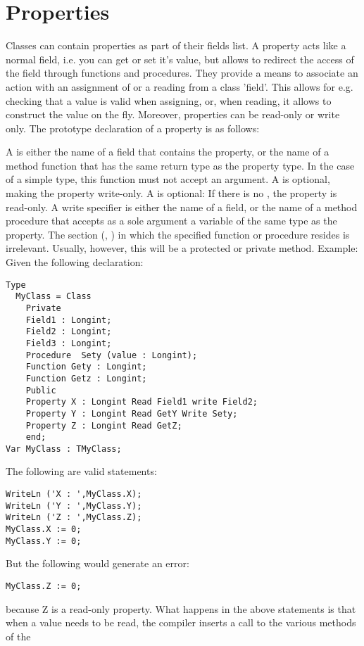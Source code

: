 \documentclass{report}
\begin{document}
\section{Properties}
Classes can contain properties as part of their fields list. A property
acts like a normal field, i.e. you can get or set it's value, but
allows to redirect the access of the field through functions and
procedures. They provide a means to associate an action with an assignment
of or a reading from a class 'field'. This allows for e.g. checking that a
value is valid when assigning, or, when reading, it allows to construct the
value on the fly. Moreover, properties can be read-only or write only.
The prototype declaration of a property is as follows:

A  is either the name of a field that contains the
property, or the name of a method function that has the same return type as
the property type. In the case of a simple type, this
function must not accept an argument. A  is optional, 
making the property write-only.
A  is optional: If there is no , the
property is read-only. A write specifier is either the name of a field, or
the name of a method procedure that accepts as a sole argument a variable of
the same type as the property.
The section (, ) in which the specified function or
procedure resides is irrelevant. Usually, however, this will be a protected
or private method.
Example:
Given the following declaration:
\begin{verbatim}
Type
  MyClass = Class
    Private
    Field1 : Longint;
    Field2 : Longint;
    Field3 : Longint;
    Procedure  Sety (value : Longint);
    Function Gety : Longint;
    Function Getz : Longint;
    Public
    Property X : Longint Read Field1 write Field2;
    Property Y : Longint Read GetY Write Sety;
    Property Z : Longint Read GetZ;
    end;
Var MyClass : TMyClass;
\end{verbatim}
The following are valid statements:
\begin{verbatim}
WriteLn ('X : ',MyClass.X);
WriteLn ('Y : ',MyClass.Y);
WriteLn ('Z : ',MyClass.Z);
MyClass.X := 0;
MyClass.Y := 0;
\end{verbatim}
But the following would generate an error:
\begin{verbatim}
MyClass.Z := 0;
\end{verbatim}
because Z is a read-only property.
What happens in the above statements is that when a value needs to be read,
the compiler inserts a call to the various  methods of the
\end{document}
